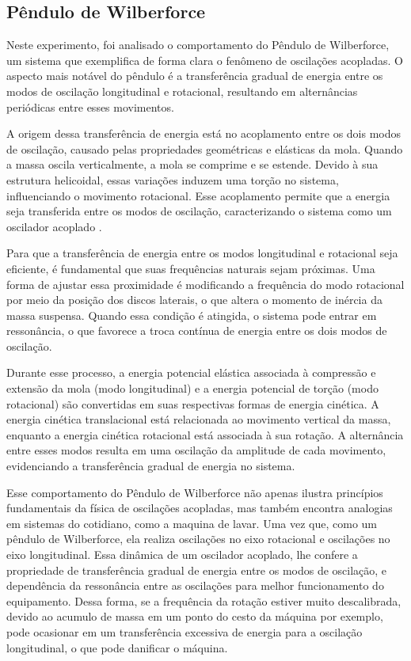 \subsection{Pêndulo de Wilberforce}
Neste experimento, foi analisado o comportamento do Pêndulo de Wilberforce, um sistema que exemplifica de forma clara o fenômeno de oscilações acopladas. O aspecto mais notável do pêndulo é a transferência gradual de energia entre os modos de oscilação longitudinal e rotacional, resultando em alternâncias periódicas entre esses movimentos.

A origem dessa transferência de energia está no acoplamento entre os dois modos de oscilação, causado pelas propriedades geométricas e elásticas da mola. Quando a massa oscila verticalmente, a mola se comprime e se estende. Devido à sua estrutura helicoidal, essas variações induzem uma torção no sistema, influenciando o movimento rotacional. Esse acoplamento permite que a energia seja transferida entre os modos de oscilação, caracterizando o sistema como um oscilador acoplado .

Para que a transferência de energia entre os modos longitudinal e rotacional seja eficiente, é fundamental que suas frequências naturais sejam próximas. Uma forma de ajustar essa proximidade é modificando a frequência do modo rotacional por meio da posição dos discos laterais, o que altera o momento de inércia da massa suspensa. Quando essa condição é atingida, o sistema pode entrar em ressonância, o que favorece a troca contínua de energia entre os dois modos de oscilação.

Durante esse processo, a energia potencial elástica associada à compressão e extensão da mola (modo longitudinal) e a energia potencial de torção (modo rotacional) são convertidas em suas respectivas formas de energia cinética. A energia cinética translacional está relacionada ao movimento vertical da massa, enquanto a energia cinética rotacional está associada à sua rotação. A alternância entre esses modos resulta em uma oscilação da amplitude de cada movimento, evidenciando a transferência gradual de energia no sistema.

Esse comportamento do Pêndulo de Wilberforce não apenas ilustra princípios fundamentais da física de oscilações acopladas, mas também encontra analogias em sistemas do cotidiano, como a maquina de lavar. Uma vez que, como um pêndulo de Wilberforce, ela realiza oscilações no 
eixo rotacional e oscilações no eixo longitudinal. Essa dinâmica de um oscilador acoplado, lhe confere a propriedade de transferência 
gradual de energia entre os modos de oscilação, e dependência da ressonância entre as oscilações para melhor funcionamento do equipamento.
Dessa forma, se a frequência da rotação estiver muito descalibrada, devido ao acumulo de massa em um ponto do cesto da máquina por exemplo,
pode ocasionar em um transferência excessiva de energia para a oscilação longitudinal, o que pode danificar o máquina.

